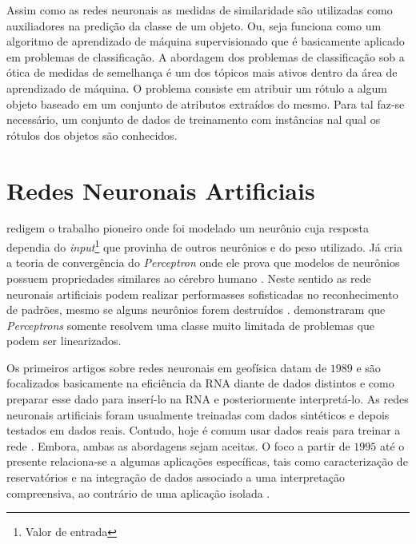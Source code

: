 
Assim como as redes neuronais as medidas de similaridade são utilizadas como auxiliadores na predição da classe de um objeto. Ou, seja funciona como um algoritmo de aprendizado de máquina supervisionado que é basicamente aplicado em problemas de classificação\citep{FreundYoav1999}. A abordagem dos problemas de classificação sob a ótica de medidas de semelhança é um dos tópicos mais ativos dentro da área de aprendizado de máquina. O problema consiste em atribuir um rótulo a algum objeto baseado em um conjunto de atributos extraídos do mesmo. Para tal faz-se necessário, um conjunto de dados de treinamento com instâncias nal qual os rótulos dos objetos são conhecidos. 

\section{Redes Neuronais Artificiais}

\citet{McCulloch1943} redigem o trabalho pioneiro onde foi modelado um neurônio cuja resposta dependia do \textit{input}\footnote{Valor de entrada} que provinha de outros neurônios e do peso utilizado.  Já \citet{Rosenblatt1962} cria a teoria de convergência do \textit{Perceptron} onde ele prova que modelos de neurônios possuem propriedades similares ao cérebro humano \citep{Kanal2001}. Neste sentido as rede neuronais artificiais podem realizar performasses sofisticadas no reconhecimento de padrões, mesmo se alguns neurônios forem destruídos \citep{Levy1997}. \citet{Minsky1969} demonstraram que \textit{Perceptrons} somente resolvem uma classe muito limitada de problemas que podem ser linearizados.

Os primeiros artigos sobre redes neuronais em geofísica datam de $1989$ e são focalizados basicamente na eficiência da RNA diante de dados distintos e como preparar esse dado para inserí-lo na RNA e posteriormente interpretá-lo. As redes neuronais artificiais foram usualmente treinadas com dados sintéticos e depois testados em dados reais. Contudo, hoje é comum usar dados reais para treinar a rede \citep{Adibifard2014}. Embora, ambas as abordagens sejam aceitas. O foco a partir de $1995$ até o presente relaciona-se a algumas aplicações específicas, tais como caracterização de reservatórios e na integração de dados associado a uma interpretação compreensiva, ao contrário de uma aplicação isolada \citep{Poulton2002}. 

